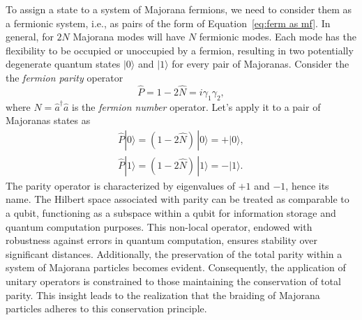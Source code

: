 \documentclass{article}
\begin{document}
To assign a state to a system of Majorana fermions, we need to consider them as a fermionic system, i.e., as pairs of the form of Equation~\ref{eq:ferm as mf}. In general, for $ 2N $ Majorana modes will have $ N $ fermionic modes. Each mode has the flexibility to be occupied or unoccupied by a fermion, resulting in two potentially degenerate quantum states $ | 0 \rangle $ and $ | 1 \rangle $ for every pair of Majoranas. Consider the the \textit{fermion parity} operator
\begin{equation}
	\hat{P} = 1- 2 \hat{N} = i \gamma_1 \gamma_2,
	\label{eq:ferm parity}
\end{equation}
where $ N = \hat{a}^\dagger \hat{a} $ is the \textit{fermion number} operator. Let's apply it to a pair of Majoranas states as
$$
	\begin{aligned}
		\hat{P} |0\rangle = (1-2\hat{N})\, |0\rangle = + |0\rangle, \\
		\hat{P} |1\rangle = (1-2\hat{N})\, |1\rangle = - |1\rangle.
	\end{aligned}
$$
The parity operator is characterized by eigenvalues of $ +1 $ and $ -1 $, hence its name. The Hilbert space associated with parity can be treated as comparable to a qubit, functioning as a subspace within a qubit for information storage and quantum computation purposes. This non-local operator, endowed with robustness against errors in quantum computation, ensures stability over significant distances. Additionally, the preservation of the total parity within a system of Majorana particles becomes evident. Consequently, the application of unitary operators is constrained to those maintaining the conservation of total parity. This insight leads to the realization that the braiding of Majorana particles adheres to this conservation principle.
\end{document}
